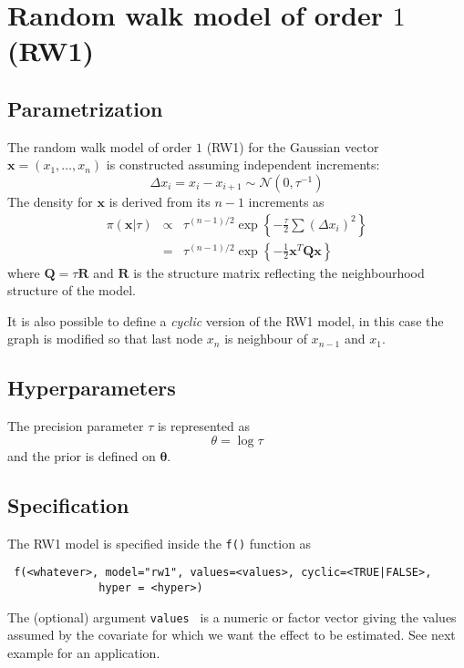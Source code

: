 \documentclass[a4paper,11pt]{article}
\begin{document}
\section*{Random walk model of order $1$ (RW1)}

\subsection*{Parametrization}

The random walk model of order $1$ (RW1) for the Gaussian vector
$\mathbf{x}=(x_1,\dots,x_n)$ is constructed assuming independent
increments:
\[
\Delta x_i = x_i-x_{i+1}\sim\mathcal{N}(0,\tau^{-1})
\]
The density for $\mathbf{x}$ is derived from its $n-1$ increments as
\begin{eqnarray*}
    \pi(\mathbf{x}|\tau) &\propto& \tau^{(n-1)/2}
    \exp\left\{-\frac{\tau}{2}\sum (\Delta x_i)^2\right\}\\
    & = &\tau^{(n-1)/2}\exp\left\{-\frac{1}{2}
      \mathbf{x}^T\mathbf{Q}\mathbf{x} \right\}
\end{eqnarray*}
where $\mathbf{Q}=\tau\mathbf{R}$ and $\mathbf{R}$ is the structure
matrix reflecting the neighbourhood structure of the model.

It is also possible to define a {\it cyclic} version of the RW1 model,
in this case the graph is modified so that last node $x_n$ is
neighbour of $x_{n-1}$ and $x_1$.
\subsection*{Hyperparameters}

The precision parameter $\tau$ is represented as
\begin{displaymath}
    \theta =\log \tau
\end{displaymath}
and the prior is defined on $\mathbf{\theta}$.

\subsection*{Specification}

The RW1 model is specified inside the {\tt f()} function as
\begin{verbatim}
 f(<whatever>, model="rw1", values=<values>, cyclic=<TRUE|FALSE>,
              hyper = <hyper>)
\end{verbatim}
The (optional) argument {\tt values } is a numeric or factor vector
giving the values assumed by the covariate for which we want the
effect to be estimated. See next example for an application.
 
\end{document}
